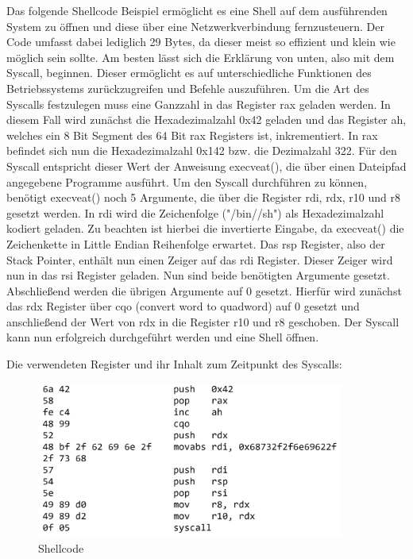 Das folgende Shellcode Beispiel ermöglicht es eine Shell auf dem ausführenden System zu öffnen und diese über eine Netzwerkverbindung fernzusteuern. 
Der Code umfasst dabei lediglich 29 Bytes, da dieser meist so effizient und klein wie möglich sein sollte. 
Am besten lässt sich die Erklärung von unten, also mit dem Syscall, beginnen. 
Dieser ermöglicht es auf unterschiedliche Funktionen des Betriebssystems zurückzugreifen und Befehle auszuführen. 
Um die Art des Syscalls festzulegen muss eine Ganzzahl in das Register rax geladen werden. 
In diesem Fall wird zunächst die Hexadezimalzahl 0x42 geladen und das Register ah, welches ein 8 Bit Segment des 64 Bit rax Registers ist, inkrementiert. 
In rax befindet sich nun die Hexadezimalzahl 0x142 bzw. die Dezimalzahl 322. Für den Syscall entspricht dieser Wert der Anweisung execveat(), 
die über einen Dateipfad angegebene Programme ausführt. Um den Syscall durchführen zu können, benötigt execveat() noch 5 Argumente, 
die über die Register rdi, rdx, r10 und r8 gesetzt werden. In rdi wird die Zeichenfolge ("/bin//sh") als Hexadezimalzahl kodiert geladen. 
Zu beachten ist hierbei die invertierte Eingabe, da execveat() die Zeichenkette in Little Endian Reihenfolge erwartet. Das rsp Register, also der Stack Pointer, 
enthält nun einen Zeiger auf das rdi Register. Dieser Zeiger wird nun in das rsi Register geladen. Nun sind beide benötigten Argumente gesetzt. 
Abschließend werden die übrigen Argumente auf 0 gesetzt. Hierfür wird zunächst das rdx Register über cqo (convert word to quadword) auf 0 gesetzt und
anschließend der Wert von rdx in die Register r10 und r8 geschoben. Der Syscall kann nun erfolgreich durchgeführt werden und eine Shell öffnen. \cite{syscalls} \cite{execman}

Die verwendeten Register und ihr Inhalt zum Zeitpunkt des Syscalls:

\begin{figure}[h]
    \centering
    \includegraphics[width=0.9\textwidth,height=0.75\textheight,keepaspectratio]{images/shellstorm.png}
    \caption{Shellcode}
\end{figure}
\cite{shellstorm}

